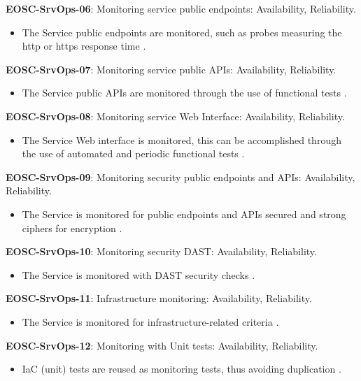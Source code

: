 \textbf{EOSC-SrvOps-06}: Monitoring service public endpoints: Availability, Reliability.

\begin{itemize}
    \item The Service public endpoints are monitored, such as probes measuring the http or https response time \cite{orviz_fernandez_eosc-synergy_2020}.
\end{itemize}

\textbf{EOSC-SrvOps-07}: Monitoring service public APIs: Availability, Reliability.

\begin{itemize}
    \item The Service public APIs are monitored through the use of functional tests \cite{orviz_fernandez_eosc-synergy_2020}.
\end{itemize}

\textbf{EOSC-SrvOps-08}: Monitoring service Web Interface: Availability, Reliability.

\begin{itemize}
    \item The Service Web interface is monitored, this can be accomplished through the use of automated and periodic functional tests \cite{orviz_fernandez_eosc-synergy_2020}.
\end{itemize}

\textbf{EOSC-SrvOps-09}: Monitoring security public endpoints and APIs: Availability, Reliability.

\begin{itemize}
    \item The Service is monitored for public endpoints and APIs secured and strong ciphers for encryption \cite{orviz_fernandez_eosc-synergy_2020}.
\end{itemize}

\textbf{EOSC-SrvOps-10}: Monitoring security DAST: Availability, Reliability.

\begin{itemize}
    \item The Service is monitored with DAST security checks \cite{orviz_fernandez_eosc-synergy_2020}.
\end{itemize}

\textbf{EOSC-SrvOps-11}: Infrastructure monitoring: Availability, Reliability.

\begin{itemize}
    \item The Service is monitored for infrastructure-related criteria \cite{orviz_fernandez_eosc-synergy_2020}.
\end{itemize}

\textbf{EOSC-SrvOps-12}: Monitoring with Unit tests: Availability, Reliability.

\begin{itemize}
    \item IaC (unit) tests are reused as monitoring tests, thus avoiding duplication \cite{orviz_fernandez_eosc-synergy_2020}.
\end{itemize}
